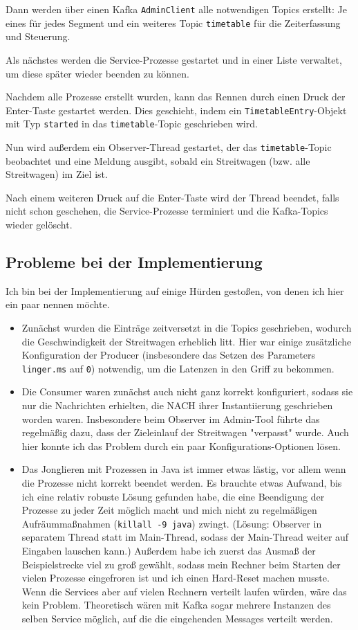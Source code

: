 \documentclass[12pt]{article}
\begin{document}
Dann werden über einen Kafka \texttt{AdminClient} alle notwendigen Topics erstellt: Je eines für jedes Segment und ein weiteres Topic \texttt{timetable} für die Zeiterfassung und Steuerung.

Als nächstes werden die Service-Prozesse gestartet und in einer Liste verwaltet, um diese später wieder beenden zu können.

Nachdem alle Prozesse erstellt wurden, kann das Rennen durch einen Druck der Enter-Taste gestartet werden.
Dies geschieht, indem ein \texttt{TimetableEntry}-Objekt mit Typ \texttt{started} in das \texttt{timetable}-Topic geschrieben wird.

Nun wird außerdem ein Observer-Thread gestartet, der das \texttt{timetable}-Topic beobachtet und eine Meldung ausgibt, sobald ein Streitwagen (bzw. alle Streitwagen) im Ziel ist.

Nach einem weiteren Druck auf die Enter-Taste wird der Thread beendet, falls nicht schon geschehen, die Service-Prozesse terminiert und die Kafka-Topics wieder gelöscht.

\subsection*{Probleme bei der Implementierung}
Ich bin bei der Implementierung auf einige Hürden gestoßen, von denen ich hier ein paar nennen möchte.

\begin{itemize}
	\item Zunächst wurden die Einträge zeitversetzt in die Topics geschrieben, wodurch die Geschwindigkeit der Streitwagen erheblich litt. 
	Hier war einige zusätzliche Konfiguration der Producer (insbesondere das Setzen des Parameters \texttt{linger.ms} auf \texttt{0}) notwendig, um die Latenzen in den Griff zu bekommen.
	
	\item Die Consumer waren zunächst auch nicht ganz korrekt konfiguriert, sodass sie nur die Nachrichten erhielten, die NACH ihrer Instantiierung geschrieben worden waren.
	Insbesondere beim Observer im Admin-Tool führte das regelmäßig dazu, dass der Zieleinlauf der Streitwagen "verpasst" wurde.
	Auch hier konnte ich das Problem durch ein paar Konfigurations-Optionen lösen.
	
	\item Das Jonglieren mit Prozessen in Java ist immer etwas lästig, vor allem wenn die Prozesse nicht korrekt beendet werden.
	Es brauchte etwas Aufwand, bis ich eine relativ robuste Lösung gefunden habe, die eine Beendigung der Prozesse zu jeder Zeit möglich macht und mich nicht zu regelmäßigen Aufräummaßnahmen (\texttt{killall -9 java}) zwingt. (Lösung: Observer in separatem Thread statt im Main-Thread, sodass der Main-Thread weiter auf Eingaben lauschen kann.)
	Außerdem habe ich zuerst das Ausmaß der Beispielstrecke viel zu groß gewählt, sodass mein Rechner beim Starten der vielen Prozesse eingefroren ist und ich einen Hard-Reset machen musste.
	Wenn die Services aber auf vielen Rechnern verteilt laufen würden, wäre das kein Problem.
	Theoretisch wären mit Kafka sogar mehrere Instanzen des selben Service möglich, auf die die eingehenden Messages verteilt werden.
\end{itemize}
\end{document}
